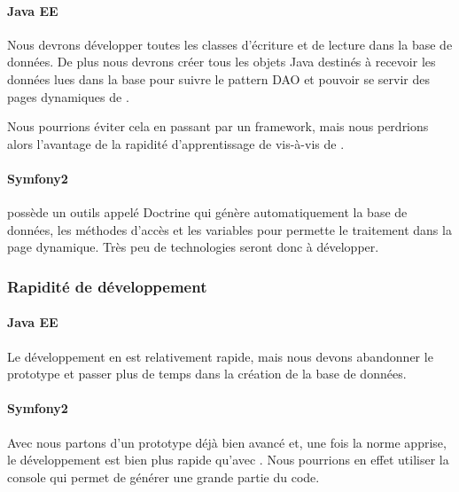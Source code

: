 \paragraph{Java EE}
Nous devrons développer toutes les classes d'écriture et de lecture dans la base de données. De plus nous devrons créer tous les objets Java destinés à recevoir les données lues dans la base pour suivre le pattern DAO et pouvoir se servir des pages dynamiques de \jee.

Nous pourrions éviter cela en passant par un framework, mais nous perdrions alors l'avantage de la rapidité d'apprentissage de \jee vis-à-vis de \symfony.

\paragraph{Symfony2}
\symfony possède un outils appelé Doctrine qui génère automatiquement la base de données, les méthodes d'accès et les variables pour permette le traitement dans la page dynamique. Très peu de technologies seront donc à développer.

\subsubsection{Rapidité de développement}
\paragraph{Java EE}
Le développement en \jee est relativement rapide, mais nous devons abandonner le prototype et passer plus de temps dans la création de la base de données.

\paragraph{Symfony2}
Avec \symfony nous partons d'un prototype déjà bien avancé et, une fois la norme apprise, le développement est bien plus rapide qu'avec \jee. Nous pourrions en effet utiliser la console \symfony qui permet de générer une grande partie du code. 

